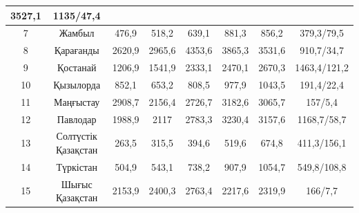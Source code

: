 \begin{table}[H]
{\begin{tabular}{|cccccccc|}
  \multicolumn{1}{c|}{3527,1} &
  1135/47,4 \\ \hline
\multicolumn{1}{|c|}{7} &
  \multicolumn{1}{c|}{Жамбыл} &
  \multicolumn{1}{c|}{476,9} &
  \multicolumn{1}{c|}{518,2} &
  \multicolumn{1}{c|}{639,1} &
  \multicolumn{1}{c|}{881,3} &
  \multicolumn{1}{c|}{856,2} &
  379,3/79,5 \\ \hline
\multicolumn{1}{|c|}{8} &
  \multicolumn{1}{c|}{Қарағанды} &
  \multicolumn{1}{c|}{2620,9} &
  \multicolumn{1}{c|}{2965,6} &
  \multicolumn{1}{c|}{4353,6} &
  \multicolumn{1}{c|}{3865,3} &
  \multicolumn{1}{c|}{3531,6} &
  910,7/34,7 \\ \hline
\multicolumn{1}{|c|}{9} &
  \multicolumn{1}{c|}{Қостанай} &
  \multicolumn{1}{c|}{1206,9} &
  \multicolumn{1}{c|}{1541,9} &
  \multicolumn{1}{c|}{2333,1} &
  \multicolumn{1}{c|}{2470,1} &
  \multicolumn{1}{c|}{2670,3} &
  1463,4/121,2 \\ \hline
\multicolumn{1}{|c|}{10} &
  \multicolumn{1}{c|}{Қызылорда} &
  \multicolumn{1}{c|}{852,1} &
  \multicolumn{1}{c|}{653,2} &
  \multicolumn{1}{c|}{808,5} &
  \multicolumn{1}{c|}{977,9} &
  \multicolumn{1}{c|}{1043,5} &
  191,4/22,4 \\ \hline
\multicolumn{1}{|c|}{11} &
  \multicolumn{1}{c|}{Маңғыстау} &
  \multicolumn{1}{c|}{2908,7} &
  \multicolumn{1}{c|}{2156,4} &
  \multicolumn{1}{c|}{2726,7} &
  \multicolumn{1}{c|}{3182,6} &
  \multicolumn{1}{c|}{3065,7} &
  157/5,4 \\ \hline
\multicolumn{1}{|c|}{12} &
  \multicolumn{1}{c|}{Павлодар} &
  \multicolumn{1}{c|}{1988,9} &
  \multicolumn{1}{c|}{2117} &
  \multicolumn{1}{c|}{2783,3} &
  \multicolumn{1}{c|}{3230,4} &
  \multicolumn{1}{c|}{3157,6} &
  1168,7/58,7 \\ \hline
\multicolumn{1}{|c|}{13} &
  \multicolumn{1}{c|}{Солтүстік Қазақстан} &
  \multicolumn{1}{c|}{263,5} &
  \multicolumn{1}{c|}{315,5} &
  \multicolumn{1}{c|}{394,6} &
  \multicolumn{1}{c|}{519,6} &
  \multicolumn{1}{c|}{674,8} &
  411,3/156,1 \\ \hline
\multicolumn{1}{|c|}{14} &
  \multicolumn{1}{c|}{Түркістан} &
  \multicolumn{1}{c|}{504,9} &
  \multicolumn{1}{c|}{543,1} &
  \multicolumn{1}{c|}{738,2} &
  \multicolumn{1}{c|}{907,9} &
  \multicolumn{1}{c|}{1054,7} &
  549,8/108,8 \\ \hline
\multicolumn{1}{|c|}{15} &
  \multicolumn{1}{c|}{Шығыс Қазақстан} &
  \multicolumn{1}{c|}{2153,9} &
  \multicolumn{1}{c|}{2400,3} &
  \multicolumn{1}{c|}{2763,4} &
  \multicolumn{1}{c|}{2217,6} &
  \multicolumn{1}{c|}{2319,9} &
  166/7,7 \\ \hline

\end{tabular}}
\end{table}
